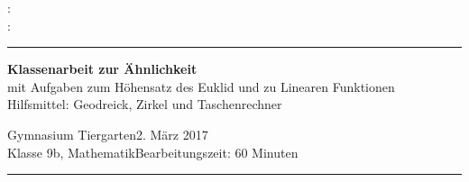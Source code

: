 \documentclass[a4paper,ngerman,12pt]{exam}
\begin{document}
:\\
:\\
\hrule

\begin{center}
{\large\bf Klassenarbeit zur Ähnlichkeit}\\[2mm]
 mit Aufgaben zum Höhensatz des Euklid und zu Linearen Funktionen\\
Hilfsmittel: Geodreick, Zirkel und Taschenrechner
\end{center}
Gymnasium Tiergarten\hfill 2. März 2017\\
Klasse 9b, Mathematik\hfill Bearbeitungszeit: 60 Minuten

\begin{center}
\addpoints\gradetable[h][questions] 
\end{center}
\hrule
\medskip
\end{document}
